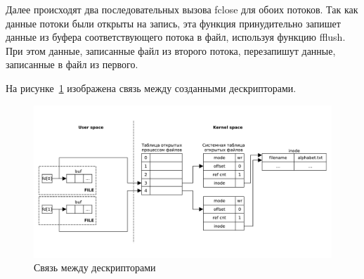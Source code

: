 Далее происходят два последовательных вызова fclose для обоих потоков. Так как данные потоки были открыты на запись, эта функция принудительно запишет данные из буфера соответствующего потока в файл, используя функцию fflush. При этом данные, записанные файл из второго потока, перезапишут данные, записанные в файл из первого.

На рисунке~\ref{pdf:task03} изображена связь между созданными дескрипторами.

\begin{figure}[H]
    \centering
    \includegraphics[scale=0.5]{pdf/task03.pdf}
    \caption{Связь между дескрипторами}\label{pdf:task03}
\end{figure}

